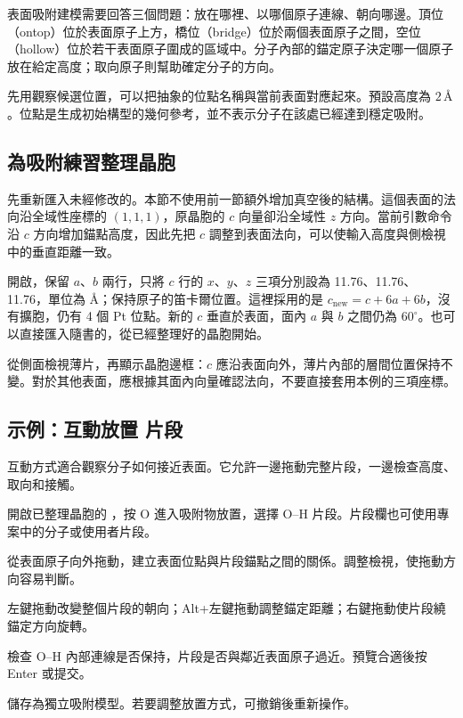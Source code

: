 表面吸附建模需要回答三個問題：放在哪裡、以哪個原子連線、朝向哪邊。頂位（ontop）位於表面原子上方，橋位（bridge）位於兩個表面原子之間，空位（hollow）位於若干表面原子圍成的區域中。分子內部的錨定原子決定哪一個原子放在給定高度；取向原子則幫助確定分子的方向。

先用觀察候選位置，可以把抽象的位點名稱與當前表面對應起來。預設高度為 $2\,\text{\AA}$。位點是生成初始構型的幾何參考，並不表示分子在該處已經達到穩定吸附。

\subsection{為吸附練習整理晶胞}

先重新匯入未經修改的。本節不使用前一節額外增加真空後的結構。這個表面的法向沿全域性座標的 $(1,1,1)$，原晶胞的 $c$ 向量卻沿全域性 $z$ 方向。當前引數命令沿 $c$ 方向增加錨點高度，因此先把 $c$ 調整到表面法向，可以使輸入高度與側檢視中的垂直距離一致。

開啟，保留 $a$、$b$ 兩行，只將 $c$ 行的 $x$、$y$、$z$ 三項分別設為 11.76、11.76、11.76，單位為 \AA；保持原子的笛卡爾位置。這裡採用的是 $c_{\mathrm{new}}=c+6a+6b$，沒有擴胞，仍有 4 個 Pt 位點。新的 $c$ 垂直於表面，面內 $a$ 與 $b$ 之間仍為 $60^\circ$。也可以直接匯入隨書的，從已經整理好的晶胞開始。

從側面檢視薄片，再顯示晶胞邊框：$c$ 應沿表面向外，薄片內部的層間位置保持不變。對於其他表面，應根據其面內向量確認法向，不要直接套用本例的三項座標。

\subsection{示例：互動放置  片段}

互動方式適合觀察分子如何接近表面。它允許一邊拖動完整片段，一邊檢查高度、取向和接觸。

\begin{steps}
  \item 開啟已整理晶胞的 ，按 O 進入吸附物放置，選擇 O--H 片段。片段欄也可使用專案中的分子或使用者片段。
  \item 從表面原子向外拖動，建立表面位點與片段錨點之間的關係。調整檢視，使拖動方向容易判斷。
  \item 左鍵拖動改變整個片段的朝向；Alt+左鍵拖動調整錨定距離；右鍵拖動使片段繞錨定方向旋轉。
  \item 檢查 O--H 內部連線是否保持，片段是否與鄰近表面原子過近。預覽合適後按 Enter 或提交。
  \item 儲存為獨立吸附模型。若要調整放置方式，可撤銷後重新操作。
\end{steps}

